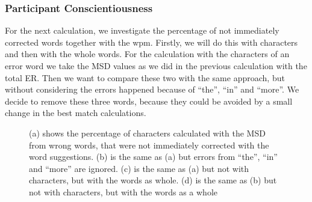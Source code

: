 \subsubsection{Participant Conscientiousness}
For the next calculation, we investigate the percentage of not immediately corrected words together with the wpm. Firstly, we will do this with characters and then with the whole words. For the calculation with the characters of an error word we take the MSD values as we did in the previous calculation with the total ER. Then we want to compare these two with the same approach, but without considering the errors happened because of ``the'', ``in'' and ``more''. We decide to remove these three words, because they could be avoided by a small change in the best match calculations.
\begin{figure}[H]
    \caption{(a) shows the percentage of characters calculated with the MSD from wrong words, that were not immediately corrected with the word suggestions. (b) is the same as (a) but errors from ``the'', ``in'' and ``more'' are ignored. (c) is the same as (a) but not with characters, but with the words as whole. (d) is the same as (b) but not with characters, but with the words as a whole}
    \label{fig:error_user}
\end{figure}

